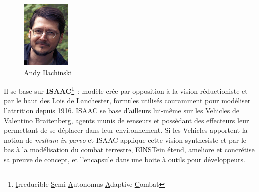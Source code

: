 \documentclass{article}
\begin{document}
\begin{center}
\begin{figure}[H]
\begin{minipage}[H]{0.25\linewidth}
	\includegraphics[width=\textwidth]{../ressources/ilachinski}
	\caption{Andy Ilachinski}
\end{minipage}
\end{figure}
\end{center}

Il se base sur \textbf{ISAAC}\footnote{\underline{I}rreducible \underline{S}emi-\underline{A}utonomus \underline{A}daptive \underline{C}ombat}~: modèle crée par opposition à la vision réductioniste et par le haut des Lois de Lanchester, formules utilisés couramment pour modéliser l'attrition depuis 1916. ISAAC se base d'ailleurs lui-même sur les \og{}Vehicles\fg{} de Valentino Braitenberg, agents munis de senseurs et possèdant des effecteurs leur permettant de se déplacer dans leur environnement. Si les Vehicles apportent la notion de \emph{multum in parvo} et ISAAC applique cette vision synthesiste et par le bas à la modélisation du combat terrestre, EINSTein étend, ameliore et concrétise sa preuve de concept, et l'encapsule dans une boite à outils pour développeurs.
\end{document}
